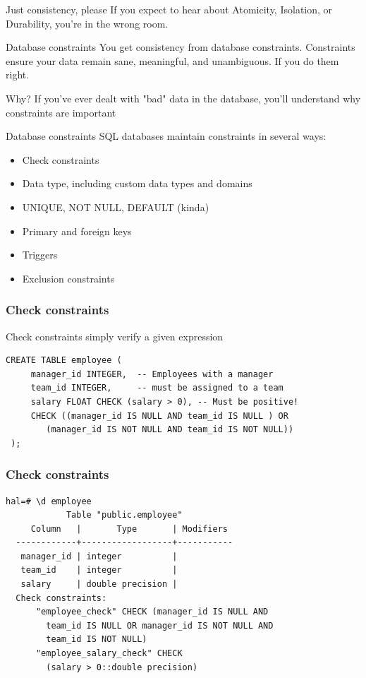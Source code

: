 \documentclass{beamer}
\begin{document}
\begin{frame}{Just consistency, please}
    If you expect to hear about Atomicity, Isolation, or Durability, you're in the wrong room.
\end{frame}

\begin{frame}{Database constraints}
    You get consistency from database constraints. Constraints ensure your data remain sane, meaningful, and unambiguous. If you do them right.
\end{frame}

\begin{frame}
    \begin{block}{Why?}
        If you've ever dealt with "bad" data in the database, you'll understand why constraints are important
    \end{block}
\end{frame}

\begin{frame}{Database constraints}
    SQL databases maintain constraints in several ways:
    \begin{itemize}
        \item Check constraints
        \item Data type, including custom data types and domains
        \item UNIQUE, NOT NULL, DEFAULT (kinda)
        \item Primary and foreign keys
        \item Triggers
        \item Exclusion constraints
    \end{itemize}
\end{frame}

\begin{frame}[fragile]
    \frametitle{Check constraints}
    Check constraints simply verify a given expression
\small
    \begin{Verbatim}[fontfamily=courier]
 CREATE TABLE employee (
     manager_id INTEGER,  -- Employees with a manager
     team_id INTEGER,     -- must be assigned to a team
     salary FLOAT CHECK (salary > 0), -- Must be positive!
     CHECK ((manager_id IS NULL AND team_id IS NULL ) OR
        (manager_id IS NOT NULL AND team_id IS NOT NULL))
 );
       \end{Verbatim}
\end{frame}
\begin{frame}[fragile]
    \frametitle{Check constraints}
\small
    \begin{Verbatim}[fontfamily=courier]
  hal=# \d employee
            Table "public.employee"
     Column   |       Type       | Modifiers
  ------------+------------------+-----------
   manager_id | integer          |
   team_id    | integer          |
   salary     | double precision |
  Check constraints:
      "employee_check" CHECK (manager_id IS NULL AND
        team_id IS NULL OR manager_id IS NOT NULL AND
        team_id IS NOT NULL)
      "employee_salary_check" CHECK
        (salary > 0::double precision)
      \end{Verbatim}
\end{frame}
\end{document}
